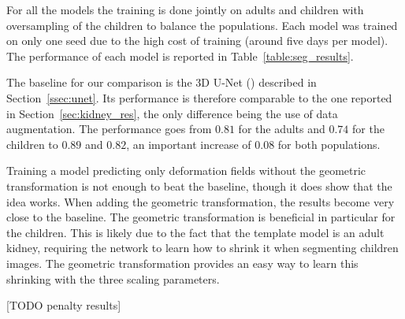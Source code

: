 For all the models the training is done jointly on adults and children with oversampling of the children to balance the populations. Each model was trained on only one seed due to the high cost of training (around five days per model). The performance of each model is reported in Table~\ref{table:seg_results}.

The baseline for our comparison is the 3D U-Net (\textcite{cicek2016MICCAI}) described in Section~\ref{ssec:unet}. Its performance is therefore comparable to the one reported in Section~\ref{sec:kidney_res}, the only difference being the use of data augmentation. The performance goes from $0.81$ for the adults and $0.74$ for the children to $0.89$ and $0.82$, an important increase of $0.08$ for both populations. 

Training a model predicting only deformation fields without the geometric transformation is not enough to beat the baseline, though it does show that the idea works. When adding the geometric transformation, the results become very close to the baseline. The geometric transformation is beneficial in particular for the children. This is likely due to the fact that the template model is an adult kidney, requiring the network to learn how to shrink it when segmenting children images. The geometric transformation provides an easy way to learn this shrinking with the three scaling parameters.

[TODO penalty results]


